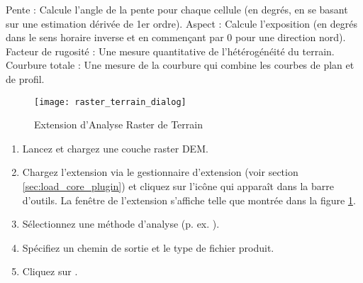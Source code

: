 Pente : Calcule l'angle de la pente pour chaque cellule (en degrés, en se basant sur une estimation dérivée de 1er ordre).
Aspect : Calcule l'exposition (en degrés dans le sens horaire inverse et en commençant par 0 pour une direction nord).
Facteur de rugosité : Une mesure quantitative de l'hétérogénéité du terrain.
Courbure totale : Une mesure de la courbure qui combine les courbes de plan et de profil.

\begin{figure}[htb]
\centering
   \texttt{[image: raster\_terrain\_dialog]}
   \caption{Extension d'Analyse Raster de Terrain \nixcaption}\label{fig:raster_terrain_dialog}
\end{figure}

\label{raster_terrain_usage}

\begin{enumerate}
  \item Lancez \qg et chargez une couche raster DEM.
  \item Chargez l'extension via le gestionnaire d'extension (voir section \ref{sec:load_core_plugin}) et cliquez sur l'icône  qui apparaît dans la barre d'outils. La fenêtre de l'extension s'affiche telle que montrée dans la figure \ref{fig:raster_terrain_dialog}.
  \item Sélectionnez une méthode d'analyse (p. ex. ).
  \item Spécifiez un chemin de sortie et le type de fichier produit.
  \item Cliquez sur .
\end{enumerate}